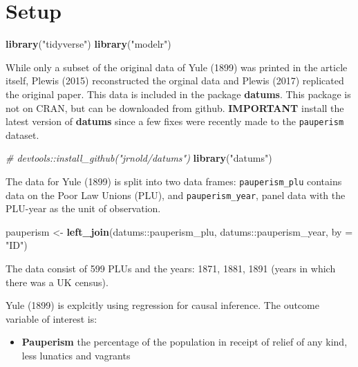 \documentclass[]{article}
\newenvironment{Shaded}{\begin{snugshade}}{\end{snugshade}}
\newcommand{\KeywordTok}[1]{\textcolor[rgb]{0.13,0.29,0.53}{\textbf{{#1}}}}
\newcommand{\DataTypeTok}[1]{\textcolor[rgb]{0.13,0.29,0.53}{{#1}}}
\newcommand{\StringTok}[1]{\textcolor[rgb]{0.31,0.60,0.02}{{#1}}}
\newcommand{\CommentTok}[1]{\textcolor[rgb]{0.56,0.35,0.01}{\textit{{#1}}}}
\newcommand{\NormalTok}[1]{{#1}}
\providecommand{\tightlist}{%
  \setlength{\itemsep}{0pt}\setlength{\parskip}{0pt}}
\begin{document}
\section{Setup}\label{setup}

\begin{Shaded}
\begin{Highlighting}[]
\KeywordTok{library}\NormalTok{(}\StringTok{"tidyverse"}\NormalTok{)}
\KeywordTok{library}\NormalTok{(}\StringTok{"modelr"}\NormalTok{)}
\end{Highlighting}
\end{Shaded}

While only a subset of the original data of Yule (1899) was printed in
the article itself, Plewis (2015) reconstructed the orginal data and
Plewis (2017) replicated the original paper. This data is included in
the package \textbf{datums}. This package is not on CRAN, but can be
downloaded from github. \textbf{IMPORTANT} install the latest version of
\textbf{datums} since a few fixes were recently made to the
\texttt{pauperism} dataset.

\begin{Shaded}
\begin{Highlighting}[]
\CommentTok{# devtools::install_github("jrnold/datums")}
\KeywordTok{library}\NormalTok{(}\StringTok{"datums"}\NormalTok{)}
\end{Highlighting}
\end{Shaded}

The data for Yule (1899) is split into two data frames:
\texttt{pauperism\_plu} contains data on the Poor Law Unions (PLU), and
\texttt{pauperism\_year}, panel data with the PLU-year as the unit of
observation.

\begin{Shaded}
\begin{Highlighting}[]
\NormalTok{pauperism <-}
\StringTok{  }\KeywordTok{left_join}\NormalTok{(datums::pauperism_plu, datums::pauperism_year,}
            \DataTypeTok{by =} \StringTok{"ID"}\NormalTok{)}
\end{Highlighting}
\end{Shaded}

The data consist of 599 PLUs and the years: 1871, 1881, 1891 (years in
which there was a UK census).

Yule (1899) is explcitly using regression for causal inference. The
outcome variable of interest is:

\begin{itemize}
\tightlist
\item
  \textbf{Pauperism} the percentage of the population in receipt of
  relief of any kind, less lunatics and vagrants
\end{itemize}
\end{document}
